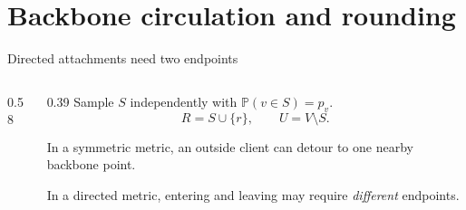 \documentclass[aspectratio=169,12pt]{beamer}
\newcommand{\Pp}{\mathbb{P}}
\newcommand{\1}{\mathbf{1}}
\begin{document}
\section{Backbone circulation and rounding}

\begin{frame}{Directed attachments need two endpoints}
  \begin{columns}[T,onlytextwidth]
    \begin{column}{0.58\textwidth}
      \centering
      \resizebox{0.90\linewidth}{!}{\StBackboneSample}
    \end{column}
    \begin{column}{0.39\textwidth}
      Sample \(S\) independently with
      \(\Pp(v\in S)=p_v\).
      \[
        R=S\cup\{r\},\qquad U=V\setminus S.
      \]

      In a symmetric metric, an outside client can detour to one nearby
      backbone point.

      \vspace{0.28cm}
      In a directed metric, entering and leaving may require
      \emph{different} endpoints.
    \end{column}
  \end{columns}
\end{frame}
\end{document}
